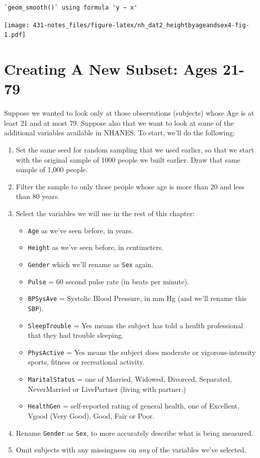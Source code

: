 \documentclass[
]{book}
\providecommand{\tightlist}{%
  \setlength{\itemsep}{0pt}\setlength{\parskip}{0pt}}
\begin{document}
\begin{verbatim}
`geom_smooth()` using formula 'y ~ x'
\end{verbatim}

\texttt{[image: 431-notes\_files/figure-latex/nh\_dat2\_heightbyageandsex4-fig-1.pdf]}

\hypertarget{creating-a-new-subset-ages-21-79}{%
\section{Creating A New Subset: Ages 21-79}\label{creating-a-new-subset-ages-21-79}}

Suppose we wanted to look only at those observations (subjects) whose Age is at least 21 and at most 79. Suppose also that we want to look at some of the additional variables available in NHANES. To start, we'll do the following:

\begin{enumerate}
\def\labelenumi{\arabic{enumi}.}
\tightlist
\item
  Set the same seed for random sampling that we used earlier, so that we start with the original sample of 1000 people we built earlier. Draw that same sample of 1,000 people.
\item
  Filter the sample to only those people whose age is more than 20 and less than 80 years.
\item
  Select the variables we will use in the rest of this chapter:

  \begin{itemize}
  \tightlist
  \item
    \texttt{Age} as we've seen before, in years.
  \item
    \texttt{Height} as we've seen before, in centimeters.
  \item
    \texttt{Gender} which we'll rename as \texttt{Sex} again.
  \item
    \texttt{Pulse} = 60 second pulse rate (in beats per minute).
  \item
    \texttt{BPSysAve} = Systolic Blood Pressure, in mm Hg (and we'll rename this \texttt{SBP}).
  \item
    \texttt{SleepTrouble} = Yes means the subject has told a health professional that they had trouble sleeping.
  \item
    \texttt{PhysActive} = Yes means the subject does moderate or vigorous-intensity sports, fitness or recreational activity.
  \item
    \texttt{MaritalStatus} = one of Married, Widowed, Divorced, Separated, NeverMarried or LivePartner (living with partner.)
  \item
    \texttt{HealthGen} = self-reported rating of general health, one of Excellent, Vgood (Very Good), Good, Fair or Poor.
  \end{itemize}
\item
  Rename \texttt{Gender} as \texttt{Sex}, to more accurately describe what is being measured.
\item
  Omit subjects with any missingness on \emph{any} of the variables we've selected.
\end{enumerate}
\end{document}

